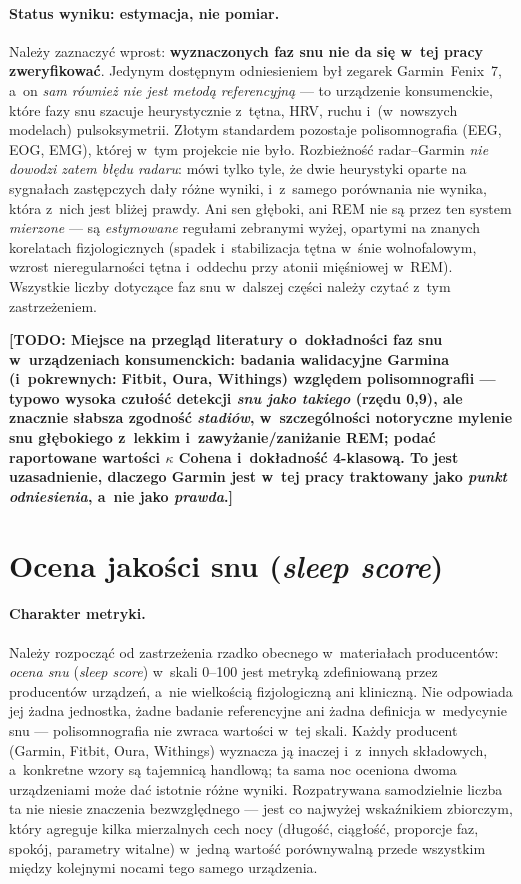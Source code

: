 \documentclass[12pt,a4paper,oneside]{report}
\newcommand{\todo}[1]{\textcolor{red!75!black}{\textbf{[TODO: #1]}}}
\newcommand{\miejsce}[1]{\todo{#1}}
\begin{document}
\paragraph{Status wyniku: estymacja, nie pomiar.} Należy zaznaczyć
wprost: \textbf{wyznaczonych faz snu nie da się w~tej pracy zweryfikować}.
Jedynym dostępnym odniesieniem był zegarek Garmin~Fenix~7, a~on \emph{sam
również nie jest metodą referencyjną} --- to urządzenie konsumenckie, które
fazy snu szacuje heurystycznie z~tętna, HRV, ruchu i~(w~nowszych modelach)
pulsoksymetrii. Złotym standardem pozostaje polisomnografia (EEG, EOG, EMG),
której w~tym projekcie nie było. Rozbieżność radar--Garmin \emph{nie dowodzi
zatem błędu radaru}: mówi tylko tyle, że dwie heurystyki oparte na sygnałach
zastępczych dały różne wyniki, i~z~samego porównania nie wynika, która z~nich
jest bliżej prawdy. Ani sen głęboki, ani REM nie są przez ten system
\emph{mierzone} --- są \emph{estymowane} regułami zebranymi wyżej, opartymi na
znanych korelatach fizjologicznych (spadek i~stabilizacja tętna w~śnie
wolnofalowym, wzrost nieregularności tętna i~oddechu przy atonii mięśniowej
w~REM). Wszystkie liczby dotyczące faz snu w~dalszej części należy czytać
z~tym zastrzeżeniem.

\miejsce{Miejsce na przegląd literatury o~dokładności faz snu w~urządzeniach
konsumenckich: badania walidacyjne Garmina (i~pokrewnych: Fitbit, Oura,
Withings) względem polisomnografii --- typowo wysoka czułość detekcji \emph{snu
jako takiego} (rzędu 0,9), ale znacznie słabsza zgodność \emph{stadiów},
w~szczególności notoryczne mylenie snu głębokiego z~lekkim i~zawyżanie/zaniżanie
REM; podać raportowane wartości $\kappa$ Cohena i~dokładność 4-klasową. To jest
uzasadnienie, dlaczego Garmin jest w~tej pracy traktowany jako \emph{punkt
odniesienia}, a~nie jako \emph{prawda}.}

\section{Ocena jakości snu (\emph{sleep score})}
\label{sec:sleep-score}

\paragraph{Charakter metryki.} Należy rozpocząć od zastrzeżenia rzadko
obecnego w~materiałach producentów: \emph{ocena snu} (\emph{sleep
score}) w~skali 0--100 jest metryką zdefiniowaną przez producentów
urządzeń, a~nie wielkością fizjologiczną ani kliniczną. Nie odpowiada jej
żadna jednostka, żadne badanie referencyjne ani żadna definicja w~medycynie snu
--- polisomnografia nie zwraca wartości w~tej skali. Każdy producent (Garmin, Fitbit,
Oura, Withings) wyznacza ją inaczej i~z~innych składowych, a~konkretne wzory są
tajemnicą handlową; ta sama noc oceniona dwoma urządzeniami może dać
istotnie różne wyniki. Rozpatrywana samodzielnie liczba ta nie niesie
znaczenia bezwzględnego --- jest co najwyżej wskaźnikiem zbiorczym, który agreguje
kilka mierzalnych cech nocy
(długość, ciągłość, proporcje faz, spokój, parametry witalne) w~jedną wartość
porównywalną przede wszystkim między kolejnymi nocami tego samego urządzenia.
\end{document}
